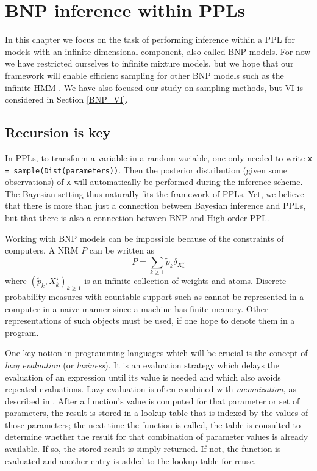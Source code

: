 
\chapter{\gls{BNP} inference within \glspl{PPL}} \label{BNP_PPL}
In this chapter we focus on the task of performing inference within a \gls{PPL} for models with an infinite dimensional component, also called \gls{BNP} models.
For now we have restricted ourselves to infinite mixture models, but we hope that our framework will enable efficient sampling for other \gls{BNP} models such as the infinite \acrlong{HMM} \cite{Beal02theinfinite}. We have also focused our study on sampling methods, but \acrlong{VI} is considered in Section \ref{BNP_VI}.

\section{Recursion is key} \label{recursion}

In \glspl{PPL}, to transform a variable in a random variable, one only needed to write \texttt{x = sample(Dist(parameters))}. Then the posterior distribution (given some observations) of \texttt{x} will automatically be performed during the inference scheme.
The Bayesian setting thus naturally fits the framework of \glspl{PPL}.
Yet, we believe that there is more  than just a connection between Bayesian inference and \glspl{PPL}, but that there is also a connection between \acrlong{BNP} and High-order \gls{PPL}.

Working with \gls{BNP} models can be impossible because of the constraints of computers.
A \gls{NRM} $P$ can be written \cite{Kingman:1967kn} as
$$P = \sum_{k \ge 1}{\tilde{p}_k \delta_{X^\star_k}} $$
where $\left(\tilde{p}_k, X^\star_k \right)_{k \ge 1}$ is an infinite collection of weights and atoms.
Discrete probability measures with countable support such as  cannot be represented in a computer in a naïve manner since a machine has finite memory.
Other representations of such objects must be used, if one hope to denote them in a program.

One key notion in programming languages which will be crucial is the concept of \textit{lazy evaluation} (or \textit{laziness}). It is an evaluation strategy which delays the evaluation of an expression until its value is needed and which also avoids repeated evaluations.
Lazy evaluation is often combined with \textit{memoization}, as described in \cite{Bentley:1982:WEP:539147}. After a function's value is computed for that parameter or set of parameters, the result is stored in a lookup table that is indexed by the values of those parameters; the next time the function is called, the table is consulted to determine whether the result for that combination of parameter values is already available. If so, the stored result is simply returned. If not, the function is evaluated and another entry is added to the lookup table for reuse.

